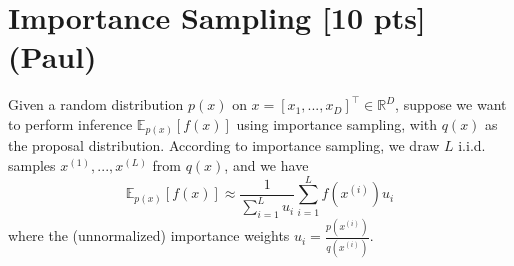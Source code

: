 \documentclass[10pt]{article}
\newcommand{\hilight}[1]{\colorbox{yellow}{#1}}
\begin{document}
\newpage

\section{Importance Sampling [10 pts] (Paul)}

Given a random distribution $p(x)$ on $x = [x_1,...,x_D]^\top \in \mathbb{R}^D$, suppose we want to perform inference $\mathbb{E}_{p(x)}[f(x)]$ using importance sampling, with $q(x)$ as the proposal distribution. According to importance sampling, we draw $L$ i.i.d. samples $x^{(1)}, ..., x^{(L)}$ from $q(x)$, and we have
\begin{equation}
\mathbb{E}_{p(x)}[f(x)] \approx \frac{1}{\sum_{i=1}^L u_i} \sum_{i=1}^L f(x^{(i)}) u_i
\end{equation}
where the (unnormalized) importance weights $u_i = \frac{p(x^{(i)})}{q(x^{(i)})}$.
\end{document}
